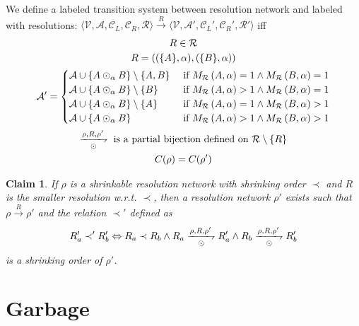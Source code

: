 \documentclass{article}
\newtheorem{claim}{Claim}
\newcommand{\varSet}{\mathcal{V}}
\newcommand{\axiomSet}{\mathcal{A}}
\newcommand{\conSet}{\mathcal{C}}
\newcommand{\resoSet}{\mathcal{R}}
\newcommand{\resoOrd}{\prec}
\newcommand{\nConclusion}[1]{C(#1)} %
\newcommand{\reso}[1]{\odot_{#1}}
\newcommand{\transition}[1]{\xrightarrow{#1}}
\newcommand{\connectivity}[3]{M_{#3} \left( #1 , #2 \right)}
\newcommand{\transitRel}[4]{\underset{#1}{\xrightharpoondown{#2,#3,#4}}}
\begin{document}
We define a labeled transition system between resolution network and labeled with resolutions: $
\langle \varSet, \axiomSet, \conSet_L, \conSet_R, \resoSet \rangle \transition{R}
\langle \varSet, \axiomSet', \conSet_L', \conSet_R', \resoSet' \rangle
$ iff
\begin{gather}
R \in \resoSet \\
R = \left( (\{A\},\alpha), (\{B\},\alpha) \right) \\
\axiomSet' = \begin{cases}
  \axiomSet \cup \{ A \reso{\alpha} B \} \setminus \{ A, B \}
    & \text{ if } \connectivity{A}{\alpha}{\resoSet} = 1 \wedge \connectivity{B}{\alpha}{\resoSet} = 1 \\
  \axiomSet \cup \{ A \reso{\alpha} B \} \setminus \{ B \}
    & \text{ if } \connectivity{A}{\alpha}{\resoSet} > 1 \wedge \connectivity{B}{\alpha}{\resoSet} = 1 \\
  \axiomSet \cup \{ A \reso{\alpha} B \} \setminus \{ A \}
    & \text{ if } \connectivity{A}{\alpha}{\resoSet} = 1 \wedge \connectivity{B}{\alpha}{\resoSet} > 1 \\
  \axiomSet \cup \{ A \reso{\alpha} B \}
    & \text{ if } \connectivity{A}{\alpha}{\resoSet} > 1 \wedge \connectivity{B}{\alpha}{\resoSet} > 1
  \end{cases} \\
  \transitRel{\odot}{\rho}{R}{\rho'} \text{ is a partial bijection defined on }
    \resoSet \setminus \{ R \} \\
  \nConclusion{\rho} = \nConclusion{\rho'}
\end{gather}

\begin{claim}If $\rho$ is a shrinkable resolution network with shrinking order $\resoOrd$ and $R$ is
  the smaller resolution w.r.t. $\resoOrd$, then a resolution network $\rho'$ exists such
  that $\rho \transition{R} \rho'$ and the relation $\resoOrd'$ defined as
  $$ R'_a \resoOrd' R'_b \Leftrightarrow
      R_a \resoOrd R_b \wedge
      R_a \transitRel{\odot}{\rho}{R}{\rho'} R'_a \wedge
      R_b \transitRel{\odot}{\rho}{R}{\rho'} R'_b
  $$ is a shrinking order of $\rho'$.
\end{claim}
  


\section{Garbage}
\end{document}
